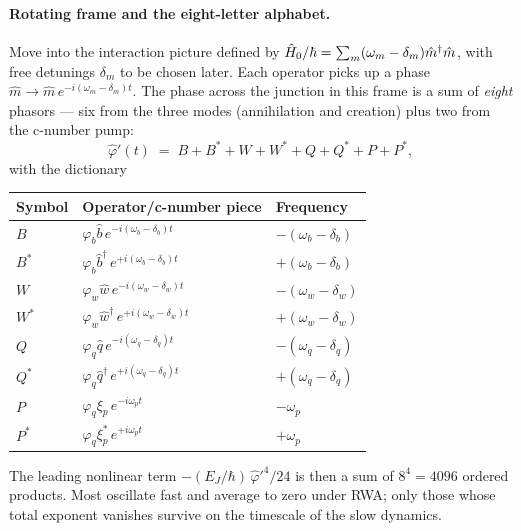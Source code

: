 \paragraph{Rotating frame and the eight-letter alphabet.}
Move into the interaction picture defined by
$\hat{H}_0/\hbar = \sum_m(\omega_m-\delta_m)\hat m^\dagger\hat m$, with
free detunings $\delta_m$ to be chosen later. Each operator picks up
a phase $\hat m \to \hat m\,e^{-i(\omega_m-\delta_m)t}$. The
phase across the junction in this frame is a sum of
\emph{eight} phasors --- six from the three modes
(annihilation and creation) plus two from the c-number pump:
\begin{equation}
\label{eq:lescanne-phi-prime}
\hat\varphi'(t) \;=\; B+B^*+W+W^*+Q+Q^*+P+P^*,
\end{equation}
with the dictionary
\begin{center}
\renewcommand{\arraystretch}{1.18}
\begin{tabular}{lll}
\toprule
Symbol & Operator/c-number piece & Frequency \\
\midrule
$B$    & $\varphi_b\hat b\,e^{-i(\omega_b-\delta_b)t}$ & $-(\omega_b-\delta_b)$ \\
$B^*$  & $\varphi_b\hat b^\dagger\,e^{+i(\omega_b-\delta_b)t}$ & $+(\omega_b-\delta_b)$ \\
$W$    & $\varphi_w\hat w\,e^{-i(\omega_w-\delta_w)t}$ & $-(\omega_w-\delta_w)$ \\
$W^*$  & $\varphi_w\hat w^\dagger\,e^{+i(\omega_w-\delta_w)t}$ & $+(\omega_w-\delta_w)$ \\
$Q$    & $\varphi_q\hat q\,e^{-i(\omega_q-\delta_q)t}$ & $-(\omega_q-\delta_q)$ \\
$Q^*$  & $\varphi_q\hat q^\dagger\,e^{+i(\omega_q-\delta_q)t}$ & $+(\omega_q-\delta_q)$ \\
$P$    & $\varphi_q\xi_p\,e^{-i\omega_p t}$ & $-\omega_p$ \\
$P^*$  & $\varphi_q\xi_p^*\,e^{+i\omega_p t}$ & $+\omega_p$ \\
\bottomrule
\end{tabular}
\end{center}
The leading nonlinear term $-(E_J/\hbar)\,\hat\varphi'^4/24$ is then a
sum of $8^4=4096$ ordered products. Most oscillate fast and average
to zero under RWA; only those whose total exponent vanishes survive
on the timescale of the slow dynamics.

